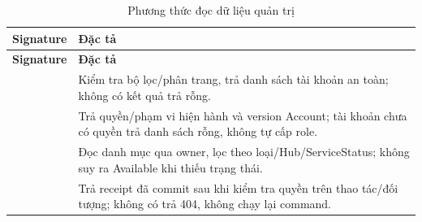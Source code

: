 \begin{longtable}{|L{58mm}|L{81mm}|}
\caption{Phương thức đọc dữ liệu quản trị}\\\hline
\textbf{Signature} & \textbf{Đặc tả}\\\hline
\endfirsthead
\hline\textbf{Signature} & \textbf{Đặc tả}\\\hline\endhead
{} &
Kiểm tra bộ lọc/phân trang, trả danh sách tài khoản an toàn; không có kết quả trả rỗng.\\\hline
{} &
Trả quyền/phạm vi hiện hành và version Account; tài khoản chưa có quyền trả danh sách rỗng, không tự cấp role.\\\hline
{} &
Đọc danh mục qua owner, lọc theo loại/Hub/ServiceStatus; không suy ra Available khi thiếu trạng thái.\\\hline
{} &
Trả receipt đã commit sau khi kiểm tra quyền trên thao tác/đối tượng; không có trả 404, không chạy lại command.\\\hline
\end{longtable}

